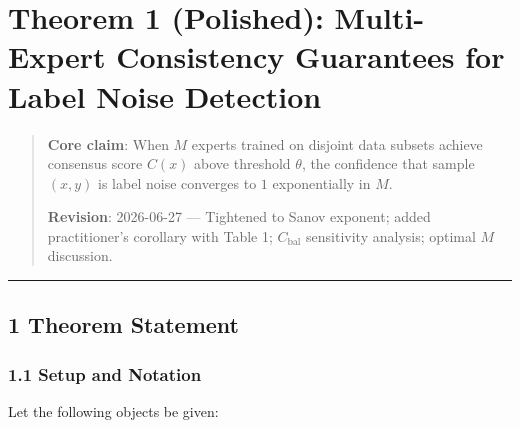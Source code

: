 \documentclass[
  12pt,
]{ctexart}
\author{SCX}
\date{2026}
\begin{document}
\section{Theorem 1 (Polished): Multi-Expert Consistency Guarantees for
Label Noise
Detection}\label{theorem-1-polished-multi-expert-consistency-guarantees-for-label-noise-detection}

\begin{quote}
\textbf{Core claim}: When \(M\) experts trained on disjoint data subsets
achieve consensus score \(C(x)\) above threshold \(\theta\), the
confidence that sample \((x, y)\) is label noise converges to \(1\)
exponentially in \(M\).

\textbf{Revision}: 2026-06-27 --- Tightened to Sanov exponent; added
practitioner's corollary with Table 1; \(C_{\text{bal}}\) sensitivity
analysis; optimal \(M\) discussion.
\end{quote}

\begin{center}\rule{0.5\linewidth}{0.5pt}\end{center}

\subsection{1 Theorem Statement}\label{theorem-statement}

\subsubsection{1.1 Setup and Notation}\label{setup-and-notation}

Let the following objects be given:
\end{document}
